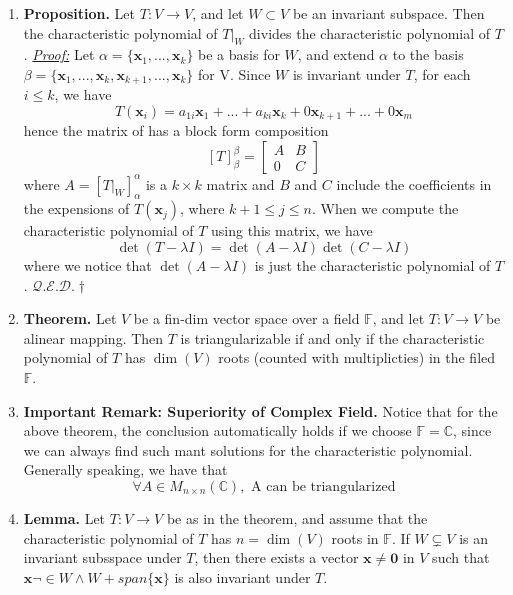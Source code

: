 \documentclass[oneside, 12pt]{book}
\newcommand{\settag}[1]{\renewcommand{\theenumi}{#1}}
\newcommand{\complex}{\mathbb{C}}
\newcommand{\field}{\mathbb{F}}
\newcommand{\qed}{\hfill $\mathcal{Q}.\mathcal{E}.\mathcal{D}.\dagger$}
\newcommand{\tbf}[1]{\textbf{#1}}
\newcommand{\tit}[1]{\textit{#1}}
\newcommand{\proof}{\tit{\underline{Proof:}}} %
\newcommand{\trans}[3]{$#1:#2\rightarrow{}#3$}
\newcommand{\map}[3]{\text{$\left[#1\right]_{#2}^{#3}$}}
\newcommand{\para}[1]{\item \tbf{#1}}
\newcommand{\vx}{\mathbf{x}}
\newcommand{\vzero}{\mathbf{0}}
\begin{document}
\begin{enumerate}
    \settag{6.1.6}
    \para{Proposition.} Let \trans{T}{V}{V}, and let $W \subset V$ be an invariant subspace. Then the characteristic polynomial
    of $T|_W$ divides the characteristic polynomial of $T$. \newline
    \proof \newline
    Let $\alpha = \{\vx_1,...,\vx_k\}$ be a basis for $W$, and extend $\alpha$ to the basis $\beta = \{ \vx_1,...,\vx_k, \vx_{k+1},...,\vx_k \}$ for V.
    Since $W$ is invariant under $T$, for each $i \leq k$, we have
    \begin{equation*}
        T(\vx_i) = a_{1i}\vx_1 + ... + a_{ki}\vx_k + 0 \vx_{k+1} + ... + 0\vx_m
    \end{equation*}
    hence the matrix of \map{T}{\beta}{\beta} has a block form composition
    \begin{equation*}
        \map{T}{\beta}{\beta} = 
        \begin{bmatrix}
            A & B \\
            0 & C
        \end{bmatrix}
    \end{equation*}
    where $A = \map{T|_W}{\alpha}{\alpha}$ is a $k \times k$ matrix and $B$ and $C$ include the coefficients in the expensions of
    $T(\vx_j)$, where $k+1 \leq j \leq n$. When we compute the characteristic polynomial of $T$ using this matrix, we have
    \begin{equation*}
        \det(T - \lambda I) = \det(A - \lambda I)\det(C - \lambda I)
    \end{equation*}
    where we notice that $\det(A - \lambda I)$ is just the characteristic polynomial of $T$. \qed

    \settag{6.1.8}
    \para{Theorem.} Let $V$ be a fin-dim vector space over a field $\field$, and let \trans{T}{V}{V} be alinear mapping. Then
    $T$ is triangularizable if and only if the characteristic polynomial of $T$ has $\dim(V)$ roots (counted with multiplicties) in
    the filed $\field$.

    \settag{6.1.9}
    \para{Important Remark: Superiority of Complex Field.} Notice that for the above theorem, the conclusion automatically holds 
    if we choose $\field = \complex$, since we can always find such mant solutions for the characteristic polynomial. Generally speaking,
    we have that
    \begin{equation*}
        \forall A \in M_{n\times n}(\complex),\,\,\text{A can be triangularized}
    \end{equation*}

    \settag{6.1.10}
    \para{Lemma.} Let \trans{T}{V}{V} be as in the theorem, and assume that the characteristic polynomial of $T$ has $n = \dim(V)$ 
    roots in $\field$. If $W \subsetneq V$ is an invariant subsspace under $T$, then there exists a vector $\vx \neq \vzero$ in $V$ such that 
    $\vx \neg \in W\wedge W + span\{\vx\}$ is also invariant under $T$.

\end{enumerate}
\end{document}
